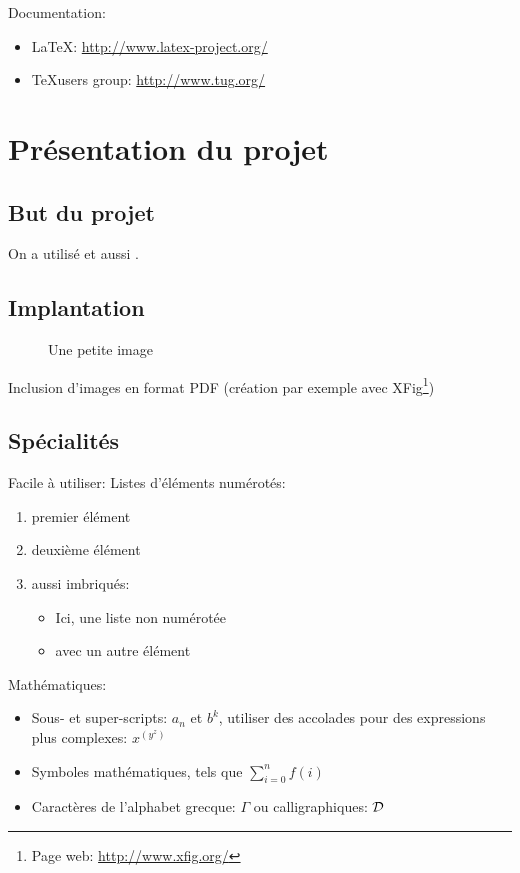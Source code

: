 \documentclass{article}
\begin{document}
Documentation: 
\begin{itemize}
\item \LaTeX: \url{http://www.latex-project.org/} 
\item \TeX users group: \url{http://www.tug.org/}
\end{itemize}


\section{Présentation du projet}

\subsection{But du projet}
On a utilisé
\cite{lindholm99_java_virtual_machin_specif,moore89_system_verif} et
aussi \cite{strecker02_verif_java_compil}.

\subsection{Implantation}

\begin{figure}[htbp]
  \centering
  \caption{Une petite image}
  \label{fig:im}
\end{figure}

Inclusion d'images en format PDF (création par exemple avec
XFig\footnote{Page web: \url{http://www.xfig.org/}})

\subsection{Spécialités}

Facile à utiliser: Listes d'éléments numérotés:
\begin{enumerate}
\item premier élément
\item deuxième élément
\item aussi imbriqués:
%
\begin{itemize}
\item Ici, une liste non numérotée
\item avec un autre élément
\end{itemize}
%
\end{enumerate}

Mathématiques:
\begin{itemize}
\item Sous- et super-scripts: $a_n$ et $b^k$, utiliser des accolades
  pour des expressions plus complexes: $x^{(y^z)}$

\item Symboles mathématiques, tels que $\sum_{i=0}^{n} f(i)$

\item Caractères de l'alphabet grecque: $\Gamma$ ou calligraphiques: ${\cal D}$
\end{itemize}
\end{document}
